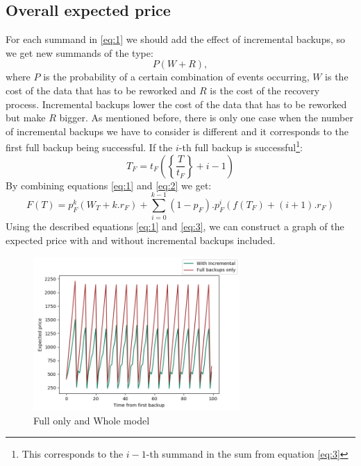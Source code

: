 \documentclass[11pt, a4paper]{article}
\theoremstyle{definition}
\begin{document}
		\subsection{Overall expected price}
		For each summand in \ref{eq:1} we should add the effect of incremental backups, so we get new summands of the type:
		$$
		P(W + R),
		$$
		where $P$ is the probability of a certain combination of events occurring, $W$ is the cost of the data that has to be reworked and $R$ is the cost of the recovery process. Incremental backups lower the cost of the data that has to be reworked but make $R$ bigger. As mentioned before, there is only one case when the number of incremental backups we have to consider is different and it corresponds to the first full backup being successful. If the $i$-th full backup is successful\footnote{This corresponds to the $i-1$-th summand in the sum from equation \ref{eq:3}}:
		$$
		T_F=t_F\left(\left\{ \frac{T}{t_F} \right\} + i - 1\right)
		$$
		By combining equations \ref{eq:1} and \ref{eq:2} we get:
		\begin{equation}\label{eq:3}
			F(T) = p_F^{k}(W_T+k.r_F) + \displaystyle\sum_{i=0}^{k-1}(1-p_F).p_F^{i}\left(f(T_F) + (i+1).r_F\right)
		\end{equation}
		Using the described equations \ref{eq:1} and \ref{eq:3}, we can construct a graph of the expected price with and without incremental backups included.
		\begin{figure}[H]
			\begin{minipage}{1.0\textwidth}
				\centering
				\includegraphics[width=0.7\textwidth]{"Weekly_full"}
				\caption{Full only and Whole model}\label{Fig:FullWeekly}
			\end{minipage}
		\end{figure}
\end{document}
